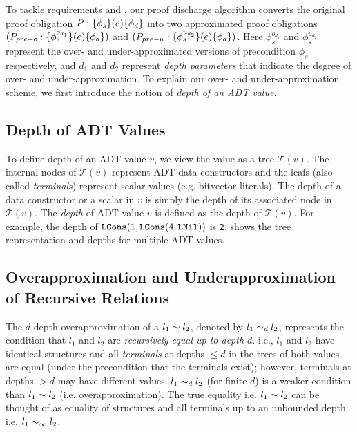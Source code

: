 To tackle requirements  and ,
our proof discharge algorithm converts the original proof obligation $P: \{\phi_s\}(e)\{\phi_d\}$
into two approximated proof obligations $(P_{pre-o}: \{\phi^{o_{d_1}}_s\}(e)\{\phi_d\})$
and $(P_{pre-u}: \{\phi^{u_{d_2}}_s\}(e)\{\phi_d\})$.
Here $\phi^{o_{d_1}}_s$ and $\phi^{u_{d_2}}_s$ represent the over- and under-approximated
versions of precondition $\phi_s$ respectively, and $d_1$ and $d_2$ represent
{\em depth parameters} that indicate the degree of over- and under-approximation.
To explain our over- and under-approximation scheme, we
first introduce the notion of {\em depth of an ADT value}.

\subsection{Depth of ADT Values}
\label{sec:adtdepth}
To define depth of an ADT value $v$, we view the value as a tree $\mathcal{T}(v)$.
The internal nodes of $\mathcal{T}(v)$ represent ADT data constructors and
the leafs (also called {\em terminals}) represent scalar values (e.g. bitvector literals).
The depth of a data constructor or a scalar in $v$ is simply the depth of
its associated node in $\mathcal{T}(v)$.
The {\em depth} of ADT value $v$ is defined as the depth of $\mathcal{T}(v)$.
For example, the depth of ${\tt LCons}(1, {\tt LCons}(4, {\tt LNil}))$ is {\tt 2}.
 shows the tree representation and depths for multiple ADT values.



\subsection{Overapproximation and Underapproximation of Recursive Relations}
\label{sec:approxdefs}
The $d$-depth overapproximation of a \recursiveRelation{} $l_1 \sim{} l_2$,
denoted by $l_1 \sim_{d} l_2$, represents the condition that
$l_1$ and $l_2$ are {\em recursively equal up to depth $d$}. i.e.,
$l_1$ and $l_2$ have identical structures and all
{\em terminals} at depths $\leq d$ in the trees of both values
are equal (under the precondition that the terminals exist);
however, terminals at depths $>d$ may have different values.
$l_1 \sim_{d} l_2$ (for finite $d$) is a weaker
condition than $l_1 \sim{} l_2$ (i.e. overapproximation).
The true equality i.e. $l_1 \sim{} l_2$ can be thought of as equality of structures
and all terminals up to an unbounded depth i.e. $l_1 \sim_{\infty} l_2$.

